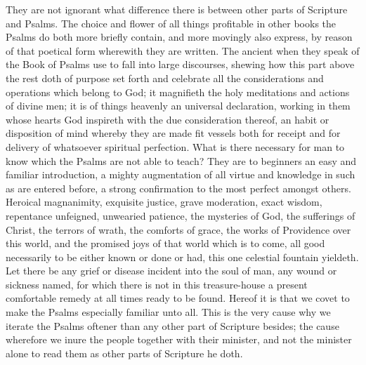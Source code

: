 They are not ignorant what difference there is between other parts of Scripture and Psalms. The choice and flower of all things profitable in other books the Psalms do both more briefly contain, and more movingly also express, by reason of that poetical form wherewith they are written. The ancient when they speak of the Book of Psalms use to fall into large discourses, shewing how this part above the rest doth of purpose set forth and celebrate all the considerations and operations which belong to God; it magnifieth the holy  meditations and actions of divine men; it is of things heavenly an universal declaration, working in them whose hearts God inspireth with the due consideration thereof, an habit or disposition of mind whereby they are made fit vessels both for receipt and for delivery of whatsoever spiritual perfection. What is there necessary for man to know which the Psalms are not able to teach? They are to beginners an easy and familiar introduction, a mighty augmentation of all virtue and knowledge in such as are entered before, a strong confirmation to the most perfect amongst others. Heroical magnanimity, exquisite justice, grave moderation, exact wisdom, repentance unfeigned, unwearied patience, the mysteries of God, the sufferings of Christ, the terrors of wrath, the comforts of grace, the works of Providence over this world, and the promised joys of that world which is to come, all good necessarily to be either known or done or had, this one celestial fountain yieldeth. Let there be any grief or disease incident into the soul of man, any wound or sickness named, for which there is not in this treasure-house a present comfortable remedy at all times ready to be found. Hereof it is that we covet to make the Psalms especially familiar unto all. This is the very cause why we iterate the Psalms oftener than any other part of Scripture besides; the cause wherefore we inure the people together with their minister, and not the minister alone to read them as other parts of Scripture he doth.

